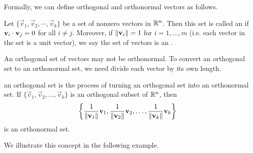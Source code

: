 \documentclass{ximera}
\begin{document}
\begin{center}
 \quad\quad\quad
\end{center}

Formally, we can define orthogonal and orthonormal vectors as follows.

\begin{definition}\label{orthset}
Let $\{ \vec{v}_1, \vec{v}_2, \cdots, \vec{v}_k \}$ be a set of nonzero
vectors in $\mathbb{R}^n$. Then this set is called an
 if 
$\mathbf{v}_i \cdot \mathbf{v}_j = 0$ for all $i \neq j$.
Moreover, if $\left\lVert\mathbf{v}_i\right\rVert=1$ for $i=1,\ldots,m$ (i.e. each vector in the set is a unit vector), we say the set of vectors is an .
\end{definition}

An orthogonal set of vectors may not be orthonormal.  To convert an orthogonal set to an orthonormal set, we need divide each vector by its own length.

\begin{definition}\label{normalizing}
 an orthogonal set is the process of turning an orthogonal set into an orthonormal set.
If $\{ \vec{v}_1, \vec{v}_2, \ldots, \vec{v}_k\}$
is an orthogonal subset of $\mathbb{R}^n$,
then
\[ \left\{
\frac{1}{\left\lVert\mathbf{v}_1\right\rVert}\mathbf{v}_1,
\frac{1}{\left\lVert\mathbf{v}_2\right\rVert}\mathbf{v}_2, \ldots,
\frac{1}{\left\lVert\mathbf{v}_k\right\rVert}\mathbf{v}_k \right\}
\]
is an orthonormal set.
\end{definition}

We illustrate this concept in the following example.
\end{document}
